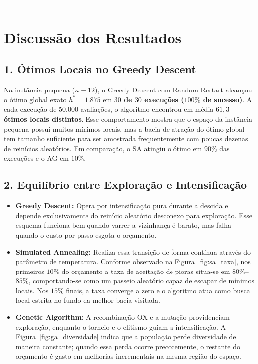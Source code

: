 \documentclass[11pt,a4paper]{article}
\begin{document}
---

\section{Discussão dos Resultados}

\subsection{1. Ótimos Locais no Greedy Descent}
Na instância pequena ($n=12$), o Greedy Descent com Random Restart alcançou o ótimo global exato $h^* = 1.875$ em \textbf{$30$ de $30$ execuções ($100\%$ de sucesso)}. A cada execução de $50.000$ avaliações, o algoritmo encontrou em média \textbf{$61,3$ ótimos locais distintos}. Esse comportamento mostra que o espaço da instância pequena possui muitos mínimos locais, mas a bacia de atração do ótimo global tem tamanho suficiente para ser amostrada frequentemente com poucas dezenas de reinícios aleatórios. Em comparação, o SA atingiu o ótimo em $90\%$ das execuções e o AG em $10\%$.

\subsection{2. Equilíbrio entre Exploração e Intensificação}
\begin{itemize}
    \item \textbf{Greedy Descent:} Opera por intensificação pura durante a descida e depende exclusivamente do reinício aleatório desconexo para exploração. Esse esquema funciona bem quando varrer a vizinhança é barato, mas falha quando o custo por passo esgota o orçamento.
    \item \textbf{Simulated Annealing:} Realiza essa transição de forma contínua através do parâmetro de temperatura. Conforme observado na Figura~\ref{fig:sa_taxa}, nos primeiros $10\%$ do orçamento a taxa de aceitação de pioras situa-se em $80\%$--$85\%$, comportando-se como um passeio aleatório capaz de escapar de mínimos locais. Nos $15\%$ finais, a taxa converge a zero e o algoritmo atua como busca local estrita no fundo da melhor bacia visitada.
    \item \textbf{Genetic Algorithm:} A recombinação OX e a mutação providenciam exploração, enquanto o torneio e o elitismo guiam a intensificação. A Figura~\ref{fig:ga_diversidade} indica que a população perde diversidade de maneira constante; quando essa perda ocorre precocemente, o restante do orçamento é gasto em melhorias incrementais na mesma região do espaço.
\end{itemize}
\end{document}
